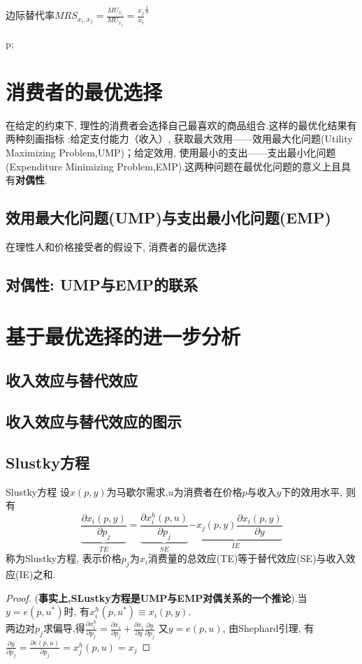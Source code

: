 \documentclass[lang=cn,10pt]{elegantbook}
\begin{document}
边际替代率$MRS_{x_i,x_j}=\frac{MU_{x_i}}{MU_{x_j}}=\frac{x_j}{x_i}^{\frac{1}{\sigma}}$

p;
\newpage
\section{消费者的最优选择}
在给定的约束下, 理性的消费者会选择自己最喜欢的商品组合.这样的最优化结果有两种刻画指标 :给定支付能力（收入）, 获取最大效用——效用最大化问题(Utility Maximizing Problem,UMP)；给定效用, 使用最小的支出——支出最小化问题(Expenditure Minimizing Problem,EMP).这两种问题在最优化问题的意义上且具有\textbf{对偶性}.

\subsection{效用最大化问题(UMP)与支出最小化问题(EMP)}
在理性人和价格接受者的假设下, 消费者的最优选择
\newpage

\subsection{对偶性: UMP与EMP的联系}
\newpage

\section{基于最优选择的进一步分析}
\newpage

\subsection{收入效应与替代效应}
\subsection{收入效应与替代效应的图示}
\subsection{Slustky方程}
\begin{theorem}{Slustky方程}
    设$x(p,y)$为马歇尔需求,$u$为消费者在价格$p$与收入$y$下的效用水平, 则有
    $$\underbrace{\frac{\partial x_i(p,y)}{\partial p_j}}_{TE} =\underbrace{\frac{\partial x_i^h(p,u)}{\partial p_j}}_{SE} \underbrace{-x_j(p,y)\frac{\partial x_i(p,y)}{\partial y}}_{IE} $$
    称为Slustky方程, 表示价格$p_j$为$x_i$消费量的总效应(TE)等于替代效应(SE)与收入效应(IE)之和.
\end{theorem}
\begin{proof}
    (\textbf{事实上,SLustky方程是UMP与EMP对偶关系的一个推论}).当$y=e(p,u^*)$时, 有$x_i^h(p,u^*)\equiv x_i(p,y)$.\\
    两边对$p_j$求偏导,得$\frac{\partial x_i^h}{\partial p_j}=\frac{\partial x_i}{\partial p_j}+\frac{\partial x_i}{\partial y}\frac{\partial y}{\partial p_j}$
    又$y=e(p,u)$, 由Shephard引理, 有$\frac{\partial y}{\partial p_j}=\frac{\partial e(p,u)}{\partial p_j}=x_j^h(p,u)=x_j$
\end{proof}
\newpage
\end{document}
